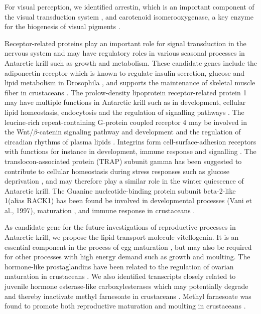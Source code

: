 For visual perception, we identified arrestin, which is an important component
of the visual transduction system \citep{montell_drosophila_2012}, and
carotenoid isomerooxygenase, a key enzyme for the biogenesis of visual pigments
\citep{voolstra_ninab_2010}.

Receptor-related proteins play an important role for signal transduction in the
nervous system and may have regulatory roles in various seasonal processes in
Antarctic krill such as growth and metabolism. These candidate genes include
the adiponectin receptor which is known to regulate insulin secretion, glucose
and lipid metabolism in Drosophila \citep{kwak_drosophila_2013}, and supports
the maintenance of skeletal muscle fiber in crustaceans
\citep{kim_molecular_2016}. The prolow-density lipoprotein receptor-related
protein 1 may have multiple functions in Antarctic krill such as in
development, cellular lipid homeostasis, endocytosis and the regulation of
signalling pathways \citep{franchini_low-density_2011}. The leucine-rich
repeat-containing G-protein coupled receptor 4 may be involved in the
Wnt/$\beta$-catenin signaling pathway and development
\citep{carmon_r-spondins_2011} and the regulation of circadian rhythms of
plasma lipids \citep{wang_lgr4_2014}. Integrins form cell-surface-adhesion
receptors with functions for instance in development, immune response and
signalling \citep{harburger_integrin_2009}. The translocon-associated protein
(TRAP) subunit gamma has been suggested to contribute to cellular homeostasis
during stress responses such as glucose deprivation
\citep{yamaguchi_translocon-associated_2011}, and may therefore play a similar
role in the winter quiescence of Antarctic krill. The Guanine
nucleotide-binding protein subunit beta-2-like 1(alias RACK1) has been found be
involved in developmental processes (Vani et al., 1997), maturation
\citep{ron_agonists_1994}, and immune response in crustaceans
\citep{jia_receptor_2016}.

As candidate gene for the future investigations of reproductive processes in
Antarctic krill, we propose the lipid transport molecule vitellogenin. It is an
essential component in the process of egg maturation
\citep{krishnan_comparative_2008}, but may also be required for other processes
with high energy demand such as growth and moulting. The hormone-like
prostaglandins have been related to the regulation of ovarian maturation in
crustaceans \citep{wimuttisuk_insights_2013}. We also identified transcripts
closely related to juvenile hormone esterase-like carboxylesterases which may
potentially degrade and thereby inactivate methyl farnesoate in crustaceans
\citep{lee_two_2011}. Methyl farnesoate was found to promote both reproductive
maturation and moulting in crustaceans \citep{reddy_involvement_2004}.

